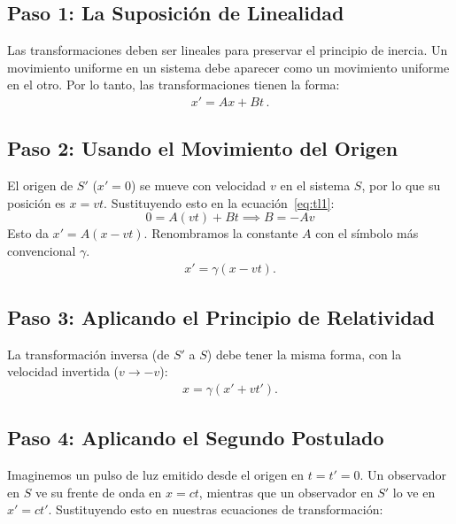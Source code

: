 \documentclass[11pt,a4paper]{article}
\begin{document}
\subsection{Paso 1: La Suposición de Linealidad}

Las transformaciones deben ser lineales para preservar el principio de inercia. Un movimiento uniforme en un sistema debe aparecer como un movimiento uniforme en el otro. Por lo tanto, las transformaciones tienen la forma:
\begin{align}
\label{eq:tl1}
 x' = Ax + Bt\,.   
\end{align}
 
\subsection{Paso 2: Usando el Movimiento del Origen}

El origen de $S'$ ($x'=0$) se mueve con velocidad $v$ en el sistema $S$, por lo que su posición es $x=vt$. Sustituyendo esto en la ecuación~\eqref{eq:tl1}:
\[ 0 = A(vt) + Bt \implies B = -Av \]
Esto da $x' = A(x-vt)$. Renombramos la constante $A$ con el símbolo más convencional $\gamma$.
\begin{align}
\label{eq:xplt}
x' = \gamma (x - vt).    
\end{align}

\subsection{Paso 3: Aplicando el Principio de Relatividad}

La transformación inversa (de $S'$ a $S$) debe tener la misma forma, con la velocidad invertida ($v \to -v$):
\begin{align}
\label{eq:invxplt}
    x = \gamma (x' + vt').
\end{align}

\subsection{Paso 4: Aplicando el Segundo Postulado}
Imaginemos un pulso de luz emitido desde el origen en $t=t'=0$. Un observador en $S$ ve su frente de onda en $x=ct$, mientras que un observador en $S'$ lo ve en $x'=ct'$. Sustituyendo esto en nuestras ecuaciones de transformación:

\end{document}
